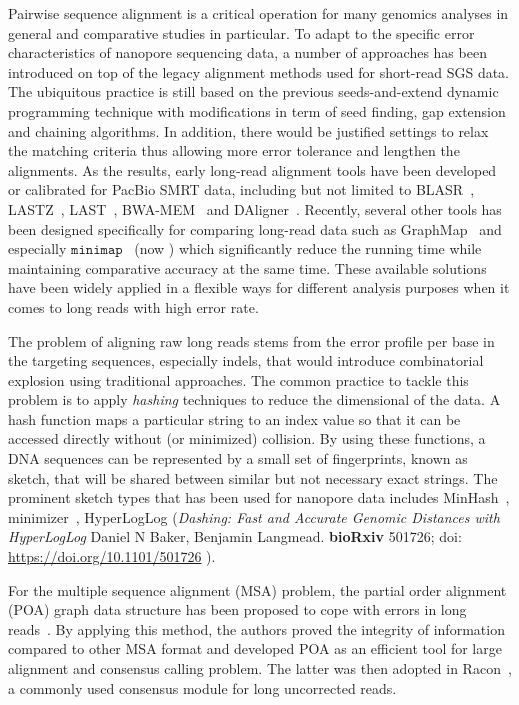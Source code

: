 Pairwise sequence alignment is a critical operation for many genomics analyses in general and  comparative studies in particular. To adapt to the specific error characteristics of nanopore sequencing data, a number of approaches has been introduced on top of the legacy alignment methods used for short-read SGS data. 
The ubiquitous practice is still based on the previous seeds-and-extend dynamic programming technique with modifications in term of seed finding, gap extension and chaining algorithms. In addition, there would be justified settings to relax the matching criteria thus allowing more error tolerance and lengthen the alignments. As the results, early long-read alignment tools have been developed or calibrated for PacBio SMRT data, including but not limited to BLASR~\cite{ChaissonT2012}, LASTZ~\cite{Harris2007lastz}, LAST~\cite{KiełbasaWSH2011}, BWA-MEM~\cite{Li2013} and DAligner~\cite{Meyer2014daligner}.
Recently, several other tools has been designed specifically for comparing long-read data such as GraphMap~\cite{Sovic2016graphmap} and especially $\mathtt{minimap}$~\cite{Li2016} (now \minimap{}) which significantly reduce the running time while maintaining comparative accuracy at the same time.
These available solutions have been widely applied in a flexible ways for different analysis purposes when it comes to long reads with high error rate.

The problem of aligning raw long reads stems from the error profile per base in the targeting sequences, especially indels, that would introduce combinatorial explosion using traditional approaches. The common practice to tackle this problem is to apply \emph{hashing} techniques to reduce the dimensional of the data. A hash function maps a particular string to an index value so that it can be accessed directly without (or minimized) collision. By using these functions, a DNA sequences can be represented by a small set of fingerprints, known as sketch, that will be shared between similar but not necessary exact strings.
The prominent sketch types that has been used for nanopore data includes MinHash~\cite{Ondov2016mash,BerlinKC2015}, minimizer~\cite{Li2016}, HyperLogLog (\emph{Dashing: Fast and Accurate Genomic Distances with HyperLogLog} 
Daniel N Baker, Benjamin Langmead.
\textbf{bioRxiv} 501726; doi: \url{https://doi.org/10.1101/501726}
).

For the multiple sequence alignment (MSA) problem, the partial order alignment (POA) graph data structure has been proposed to cope with errors in long reads~\cite{Lee2002multiple,Lee2003generating,Grasso2004combining}. By applying this method, the authors proved the integrity of information compared to other MSA format and developed POA as an efficient tool for large alignment and consensus calling problem. The latter was then adopted in Racon~\cite{Vaser2017racon}, a commonly used consensus module for long uncorrected reads.

